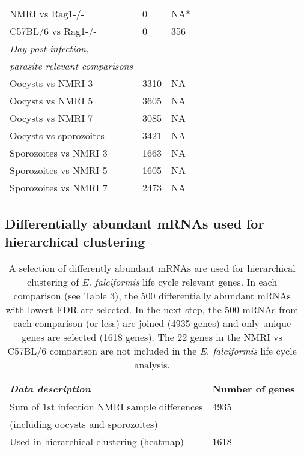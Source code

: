 \documentclass{article}
\begin{document}
\begin{table}[H]
\begin{center}
\begin{tabular}{*3l}
	NMRI vs Rag1-/-     		& 0 & NA* 	\\
	C57BL/6 vs Rag1-/-  		& 0   & 356 	\\ \midrule
\textit{Day post infection,} & 		 & 		 \\ 
\textit{parasite relevant comparisons} 	    & 		&  \\ \midrule
	Oocysts vs NMRI 3  	& 3310 & NA \\  
	Oocysts vs NMRI 5	& 3605 & NA \\ 
	Oocysts vs NMRI 7	& 3085 & NA \\ 
	Oocysts vs sporozoites  & 3421 & NA \\
	Sporozoites vs NMRI 3 	& 1663 & NA \\
	Sporozoites vs NMRI 5 	& 1605 & NA \\
	Sporozoites vs NMRI 7 	& 2473 & NA \\ \bottomrule
	\hline
\end{tabular}
\end{center}
\end{table}
\subsection{Differentially abundant mRNAs used for hierarchical clustering}
\setlength{\tabcolsep}{10pt}
\begin{table}[H]
\begin{center}
\caption{A selection of differently abundant mRNAs are used for hierarchical clustering of \textit{E. falciformis}
life cycle relevant genes. In each comparison (see Table 3), the 500 differentially abundant mRNAs with lowest FDR
are selected. In the next step, the 500 mRNAs from each comparison (or less) are joined (4935 genes) and only 
unique genes are selected (1618 genes). The 22 genes in the NMRI vs C57BL/6 
comparison are not included in the \textit{E. falciformis} life cycle analysis.}
\begin{tabular}{*2l}    \toprule
	\textit{Data description} & Number of genes \\ \midrule
	Sum of 1st infection NMRI sample differences	& 4935  \\ 
	(including oocysts and sporozoites)	\\	
	Used in hierarchical clustering (heatmap)  	& 1618 \\ 	\bottomrule	
\hline
\end{tabular}
\end{center}
\end{table}
\end{document}
